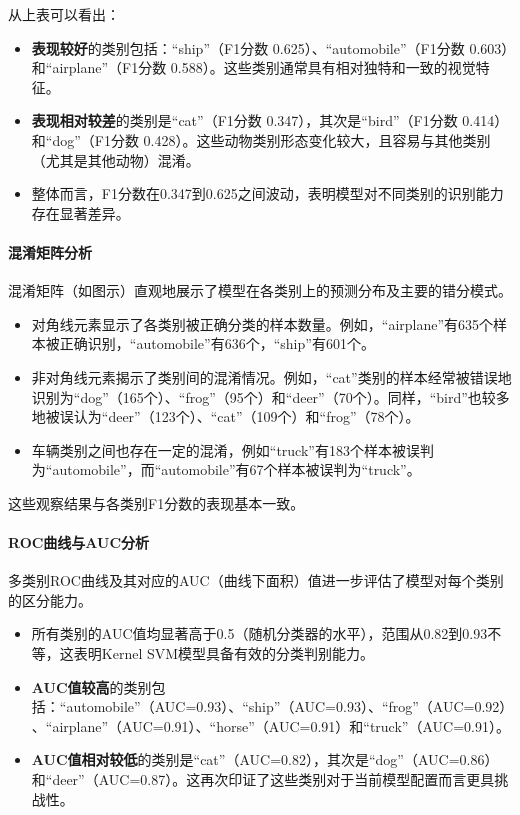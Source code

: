 \documentclass[UTF8]{report}
\theoremstyle{MyLineTheoremStyle} %
\theoremstyle{MyBlockTheoremStyle} %
\theoremstyle{MySubsubsectionStyle} %
\begin{document}
从上表可以看出：
\begin{itemize}
    \item \textbf{表现较好}的类别包括：“ship”（F1分数 0.625）、“automobile”（F1分数 0.603）和“airplane”（F1分数 0.588）。这些类别通常具有相对独特和一致的视觉特征。
    \item \textbf{表现相对较差}的类别是“cat”（F1分数 0.347），其次是“bird”（F1分数 0.414）和“dog”（F1分数 0.428）。这些动物类别形态变化较大，且容易与其他类别（尤其是其他动物）混淆。
    \item 整体而言，F1分数在0.347到0.625之间波动，表明模型对不同类别的识别能力存在显著差异。
\end{itemize}

\paragraph{混淆矩阵分析}
混淆矩阵（如图示）直观地展示了模型在各类别上的预测分布及主要的错分模式。
\begin{itemize}
    \item 对角线元素显示了各类别被正确分类的样本数量。例如，“airplane”有635个样本被正确识别，“automobile”有636个，“ship”有601个。
    \item 非对角线元素揭示了类别间的混淆情况。例如，“cat”类别的样本经常被错误地识别为“dog”（165个）、“frog”（95个）和“deer”（70个）。同样，“bird”也较多地被误认为“deer”（123个）、“cat”（109个）和“frog”（78个）。
    \item 车辆类别之间也存在一定的混淆，例如“truck”有183个样本被误判为“automobile”，而“automobile”有67个样本被误判为“truck”。
\end{itemize}
这些观察结果与各类别F1分数的表现基本一致。

\paragraph{ROC曲线与AUC分析}
多类别ROC曲线及其对应的AUC（曲线下面积）值进一步评估了模型对每个类别的区分能力。
\begin{itemize}
    \item 所有类别的AUC值均显著高于0.5（随机分类器的水平），范围从0.82到0.93不等，这表明Kernel SVM模型具备有效的分类判别能力。
    \item \textbf{AUC值较高}的类别包括：“automobile”（AUC=0.93）、“ship”（AUC=0.93）、“frog”（AUC=0.92）、“airplane”（AUC=0.91）、“horse”（AUC=0.91）和“truck”（AUC=0.91）。
    \item \textbf{AUC值相对较低}的类别是“cat”（AUC=0.82），其次是“dog”（AUC=0.86）和“deer”（AUC=0.87）。这再次印证了这些类别对于当前模型配置而言更具挑战性。
\end{itemize}
\end{document}
